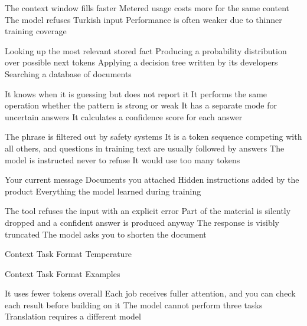 \documentclass[11pt,a4paper]{article}
\begin{document}
\begin{questions}
  {The context window fills faster}
  {Metered usage costs more for the same content}
  {The model refuses Turkish input}
  {Performance is often weaker due to thinner training coverage}

  {Looking up the most relevant stored fact}
  {Producing a probability distribution over possible next tokens}
  {Applying a decision tree written by its developers}
  {Searching a database of documents}

  {It knows when it is guessing but does not report it}
  {It performs the same operation whether the pattern is strong or weak}
  {It has a separate mode for uncertain answers}
  {It calculates a confidence score for each answer}

  {The phrase is filtered out by safety systems}
  {It is a token sequence competing with all others, and questions in training text are usually followed by answers}
  {The model is instructed never to refuse}
  {It would use too many tokens}

  {Your current message}
  {Documents you attached}
  {Hidden instructions added by the product}
  {Everything the model learned during training}

  {The tool refuses the input with an explicit error}
  {Part of the material is silently dropped and a confident answer is produced anyway}
  {The response is visibly truncated}
  {The model asks you to shorten the document}

  {Context}
  {Task}
  {Format}
  {Temperature}

  {Context}
  {Task}
  {Format}
  {Examples}

  {It uses fewer tokens overall}
  {Each job receives fuller attention, and you can check each result before building on it}
  {The model cannot perform three tasks}
  {Translation requires a different model}


\end{questions}
\end{document}
